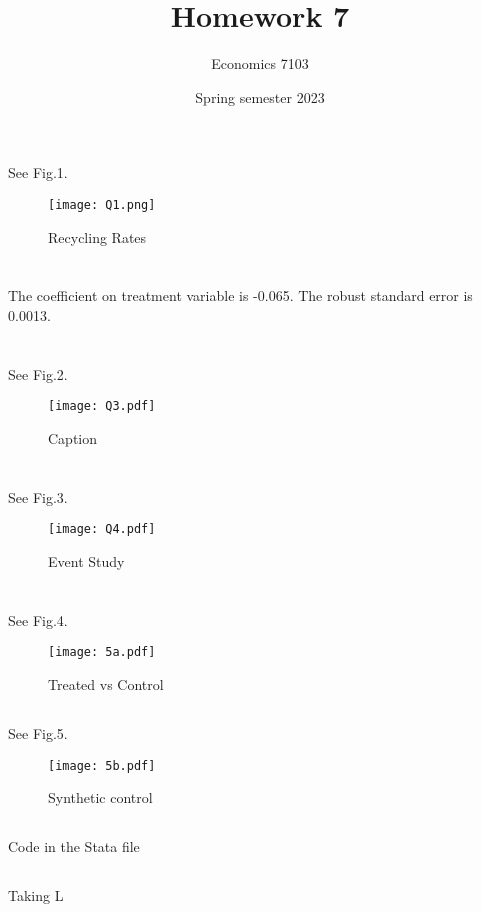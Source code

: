 \documentclass{article}
\title{Homework 7}
\author{Economics 7103}
\date{Spring semester 2023}
\begin{document}
\maketitle
\section{}
See Fig.1.
\begin{figure}
    \centering
    \begin{adjustbox}{width=\textwidth}
    \texttt{[image: Q1.png]}
    \end{adjustbox}
    \caption{Recycling Rates}
    \label{fig:my_label}
\end{figure}

\section{}
The coefficient on treatment variable is -0.065. The robust standard error is 0.0013.


\section{}
See Fig.2.
\begin{figure}
    \centering
    \texttt{[image: Q3.pdf]}
    \caption{Caption}
    \label{fig:my_label}
\end{figure}
\section{}
See Fig.3. 
\begin{figure}
    \centering
    \texttt{[image: Q4.pdf]}
    \caption{Event Study}
    \label{fig:my_label}
\end{figure}
\section{}
\subsection{}
See Fig.4. 
\begin{figure}
    \centering
    \texttt{[image: 5a.pdf]}
    \caption{Treated vs Control}
    \label{fig:my_label}
\end{figure}


\subsection{}
See Fig.5.
\begin{figure}
    \centering
    \texttt{[image: 5b.pdf]}
    \caption{Synthetic control}
    \label{fig:my_label}
\end{figure}

\subsection{}
Code in the Stata file

\subsection{}
Taking L 
\end{document}
